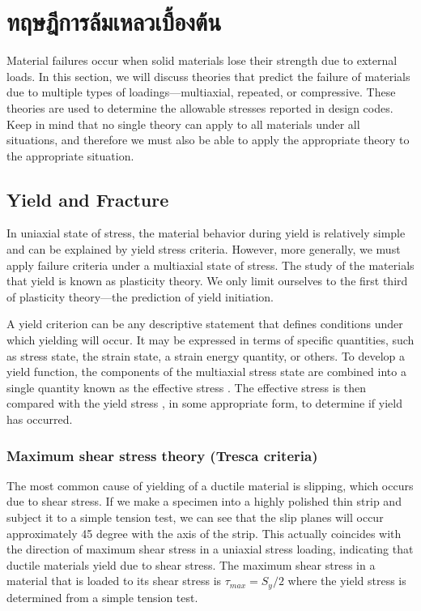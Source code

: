 \documentclass[a4paper,openany,nobib]{tufte-book}
\begin{document}
\section{ทฤษฎีการล้มเหลวเบื้องต้น}
\label{sec:orgbf9d556}

Material failures occur when solid materials lose their strength due to
external loads. In this section, we will discuss theories that predict
the failure of materials due to multiple types of loadings---multiaxial,
repeated, or compressive. These theories are used to determine the
allowable stresses reported in design codes. Keep in mind that no single
theory can apply to all materials under all situations, and therefore we
must also be able to apply the appropriate theory to the appropriate
situation.

\subsection{Yield and Fracture}
\label{sec:orgd0f2e53}

In uniaxial state of stress, the material behavior during yield is
relatively simple and can be explained by yield stress criteria.
However, more generally, we must apply failure criteria under a
multiaxial state of stress. The study of the materials that yield is
known as plasticity theory. We only limit ourselves to the first third
of plasticity theory---the prediction of yield initiation.

A yield criterion can be any descriptive statement that defines conditions under which yielding will occur. It may be expressed in terms of specific quantities, such as stress state, the strain state, a strain energy quantity, or others. To develop a yield function, the components of the multiaxial stress state are combined into a single quantity known as the effective stress . The effective stress is then compared with the yield stress , in some appropriate form, to determine if yield has occurred.

\subsubsection{Maximum shear stress theory (Tresca criteria)}
\label{maximum-shear-stress-theory-tresca-criteria}
The most common cause of yielding of a ductile material is slipping,
which occurs due to shear stress. If we make a specimen into a highly
polished thin strip and subject it to a simple tension test, we can see
that the slip planes will occur approximately 45 degree with the axis of
the strip. This actually coincides with the direction of maximum shear
stress in a uniaxial stress loading, indicating that ductile materials
yield due to shear stress. The maximum shear stress in a material that
is loaded to its shear stress is \(\tau_{max} = S_y / 2\) where the yield
stress is determined from a simple tension test.
\end{document}
